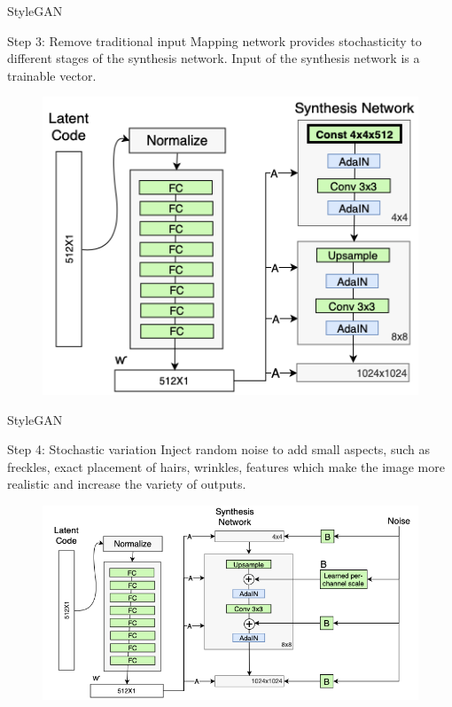 \documentclass{beamer}
\begin{document}
\begin{frame}{StyleGAN}
	\begin{block}{Step 3: Remove traditional input}
		Mapping network provides stochasticity to different stages of the synthesis network. Input of the synthesis network is a trainable vector.
		\begin{figure}
			\centering
			\includegraphics[width=0.55\linewidth]{figs/stylegan_input}
		\end{figure}
	\end{block}

\end{frame}
\begin{frame}{StyleGAN}
	\begin{block}{Step 4: Stochastic variation}
		Inject random noise to add small aspects, such as freckles, exact placement of hairs, wrinkles, features which make the image more realistic and increase the variety of outputs.
		\begin{figure}
			\centering
			\includegraphics[width=0.9\linewidth]{figs/stylegan_noise}
		\end{figure}
	\end{block}

\end{frame}
\end{document}
